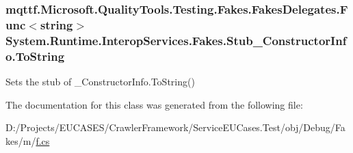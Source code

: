 \hypertarget{class_system_1_1_runtime_1_1_interop_services_1_1_fakes_1_1_stub___constructor_info_adfdd50a72a5b3b546c6265fe84866b9c}{
\subsubsection[{To\-String}]{\setlength{\rightskip}{0pt plus 5cm}mqttf.\-Microsoft.\-Quality\-Tools.\-Testing.\-Fakes.\-Fakes\-Delegates.\-Func$<$string$>$ System.\-Runtime.\-Interop\-Services.\-Fakes.\-Stub\-\_\-\-Constructor\-Info.\-To\-String}}\label{class_system_1_1_runtime_1_1_interop_services_1_1_fakes_1_1_stub___constructor_info_adfdd50a72a5b3b546c6265fe84866b9c}


Sets the stub of \-\_\-\-Constructor\-Info.\-To\-String()



The documentation for this class was generated from the following file\-:\begin{DoxyCompactItemize}
\item 
D\-:/\-Projects/\-E\-U\-C\-A\-S\-E\-S/\-Crawler\-Framework/\-Service\-E\-U\-Cases.\-Test/obj/\-Debug/\-Fakes/m/\hyperlink{m_2f_8cs}{f.\-cs}\end{DoxyCompactItemize}

